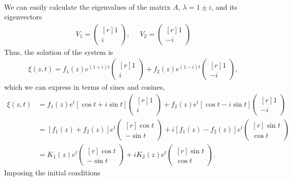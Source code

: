 \begin{questions}
\begin{solution}
\begin{align*}
\end{align*}
We can easily calculate the eigenvalues of the matrix $A$, $\lambda=1\pm i$, and its eigenvectors
\begin{align*}
V_1=\begin{pmatrix*}[r]
1\\
i
\end{pmatrix*},~~~~~~
V_2=\begin{pmatrix*}[r]
1\\
-i
\end{pmatrix*}
\end{align*}
Thus, the solution of the system is
\begin{align*}
\xi(z,t)=f_1(z)e^{(1+i)t}\begin{pmatrix*}[r]
1\\
i
\end{pmatrix*}+f_2(z)e^{(1-i)t}\begin{pmatrix*}[r]
1\\
-i
\end{pmatrix*},
\end{align*}
which we can express in terms of sines and cosines,
\begin{align*}
\xi(z,t)&=f_1(z)e^t\left[\cos{t}+i\sin{t} \right]\begin{pmatrix*}[r]
1\\
i
\end{pmatrix*}+f_2(z)e^t\left[\cos{t}-i\sin{t} \right]\begin{pmatrix*}[r]
1\\
-i
\end{pmatrix*}\\
&=\left[f_1(z)+f_2(z)\right]e^t\begin{pmatrix*}[r]
\cos{t}\\
-\sin{t}
\end{pmatrix*}+i\left[f_1(z)-f_2(z)\right]e^t\begin{pmatrix*}[r]
\sin{t}\\
\cos{t}
\end{pmatrix*}\\
&=K_1(z)e^t\begin{pmatrix*}[r]
\cos{t}\\
-\sin{t}
\end{pmatrix*}+iK_2(z)e^t\begin{pmatrix*}[r]
\sin{t}\\
\cos{t}
\end{pmatrix*}.
\end{align*}
Imposing the initial conditions
\begin{align*}

\end{align*}
\end{solution}
\end{questions}
